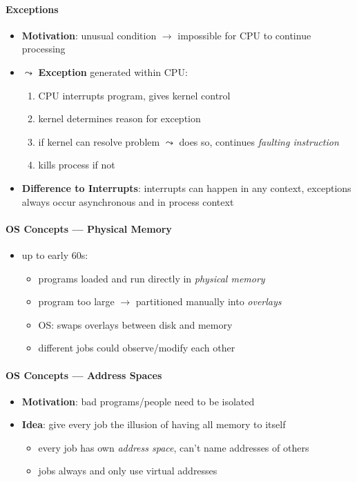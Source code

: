 \paragraph{Exceptions}
\begin{itemize}
	\item \textbf{Motivation}: unusual condition $ \to $ impossible for CPU to continue processing
	\item $ \leadsto $ \textbf{Exception} generated within CPU:
	\begin{enumerate}
		\item CPU interrupts program, gives kernel control
		\item kernel determines reason for exception
		\item if kernel can resolve problem $ \leadsto $ does so, continues \emph{faulting instruction}
		\item kills process if not
	\end{enumerate}
	\item \textbf{Difference to Interrupts}: interrupts can happen in any context, exceptions always occur asynchronous and in process context
\end{itemize}

\paragraph{OS Concepts --- Physical Memory}
\begin{itemize}
	\item up to early 60s:
	\begin{itemize}
		\item programs loaded and run directly in \emph{physical memory}
		\item program too large $ \to $ partitioned manually into \emph{overlays}
		\item OS: swaps overlays between disk and memory
		\item different jobs could observe/modify each other
	\end{itemize}
\end{itemize}

\paragraph{OS Concepts --- Address Spaces}
\begin{itemize}
	\item \textbf{Motivation}: bad programs/people need to be isolated
	\item \textbf{Idea}: give every job the illusion of having all memory to itself
	\begin{itemize}
		\item every job has own \emph{address space}, can't name addresses of others
		\item jobs always and only use virtual addresses
	\end{itemize}
\end{itemize}

